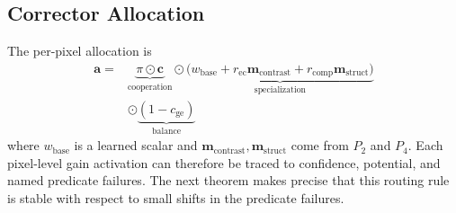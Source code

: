 \documentclass{ieeetj}
\begin{document}
\subsection{Corrector Allocation}
The per-pixel allocation is
\begin{equation}
\begin{aligned}
\mathbf{a} ={}&
\underbrace{\pi \odot \mathbf{c}}_{\text{cooperation}} \odot
\underbrace{\big(w_{\text{base}} + r_{\text{ec}}\mathbf{m}_{\text{contrast}}
+ r_{\text{comp}}\mathbf{m}_{\text{struct}}\big)}_{\text{specialization}} \\
&\odot \underbrace{(1 - c_{\text{ge}})}_{\text{balance}}
\end{aligned}
\label{eq:allocation}
\end{equation}
where $w_\text{base}$ is a learned scalar and $\mathbf{m}_\text{contrast},\mathbf{m}_\text{struct}$ come from $P_2$ and $P_4$. Each pixel-level gain activation can therefore be traced to confidence, potential, and named predicate failures. The next theorem makes precise that this routing rule is stable with respect to small shifts in the predicate failures.
\end{document}
